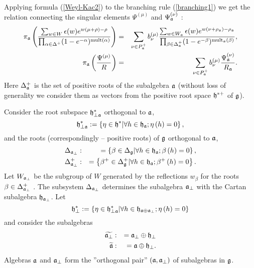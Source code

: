Applying formula (\ref{Weyl-Kac2}) to the branching rule (\ref{branching1})
we get the relation connecting the
singular elements $\Psi ^{\left( \mu \right) }$ and $\Psi _{ \mathfrak{a}}^{\left( \nu \right) }$ :
\begin{eqnarray}
\nonumber
\pi _{\af}\left( \frac{\sum_{w \in W}\epsilon (w )e^{w
(\mu +\rho )-\rho }}{\prod_{\alpha \in \Delta ^{+}}(1-e^{-\alpha })^{\mathrm{%
mult}(\alpha )}}\right) &=&\sum_{\nu \in P_{\af}^{+}}b_{\nu }^{(\mu )}%
\frac{\sum_{w \in W_{\af}}\epsilon (w )e^{w (\nu +\rho _{%
\af})-\rho _{\af}}}{\prod_{\beta \in \Delta _{\af%
}^{+}}(1-e^{-\beta })^{\mathrm{mult}_{\af}(\beta )}},  \label{eq:4} \\
\pi _{\af}\left( \frac{\Psi ^{\left( \mu \right) }}{R}\right)
&=&\sum_{\nu \in P_{\af}^{+}}b_{\nu }^{(\mu )}\frac{\Psi _{ \frak{%
a}}^{\left( \nu \right) }}{R_{\af}}.
\end{eqnarray}
Here $\Delta _{\mathfrak{a}}^{+}$ is the set of
positive roots of the subalgebra $\mathfrak{a}$ (without loss of generality we consider
them as vectors from the positive root space $\frak{h}^{\ast  +}$ of $\frak{g}$).


Consider the root subspace
$\frak{h}_{\perp \mathfrak{a}}^{\ast }$ orthogonal to  $\mathfrak{a}$,
\begin{equation*}
\frak{h}_{\perp \mathfrak{a}}^{\ast }:=\left\{ \eta \in \frak{h}^{\ast }
|\forall h \in \mathfrak{h}_{\mathfrak{a}};  \eta\left(h \right)=0 \right\} ,
\end{equation*}
and the roots (correspondingly -- positive roots) of $\frak{g}$ orthogonal
to $\mathfrak{a}$,
\begin{eqnarray*}
\Delta _{\af_{\perp }} &:&=\left\{ \beta \in \Delta _{\frak{g}}|
\forall h \in \hf_{\af};  \beta\left(h \right)=0  \right\} , \\
\Delta _{\af_{\perp }}^{+} &:&=\left\{ \beta ^{+}\in \Delta _{\frak{g}%
}^{+}|\forall h \in \hf_{\af};  \beta^{+}\left(h \right)=0  \right\} .
\end{eqnarray*}
Let $W_{\mathfrak{a}_{\perp }}$ be the subgroup of $W$ generated by the
reflections $w _{\beta }$ for the roots $\beta \in \Delta _{\af%
_{\perp }}^{+}$ . The subsystem $\Delta _{\mathfrak{a}_{\perp }}$ determines the
subalgebra $\mathfrak{a}_{\perp }$ with the Cartan subalgebra $\frak{h}_{\af%
_{\perp }}$. Let
\begin{equation*}
\frak{h}_{\perp }^{\ast }:=\left\{ \eta \in \frak{h}_{\perp \mathfrak{a}}^{\ast
}|\forall h \in \mathfrak{h}_{\mathfrak{a}\oplus \mathfrak{a}_{\perp}}; \eta \left( h \right)=0 \right\}
\end{equation*}
and consider the subalgebras
\begin{eqnarray*}
\widetilde{\mathfrak{a}_{\perp }} &:&=\mathfrak{a}_{\perp }\oplus \frak{h}_{\perp }
\\
\widetilde{\mathfrak{a}} &:&=\mathfrak{a}\oplus \frak{h}_{\perp }.
\end{eqnarray*}
Algebras $\mathfrak{a}$ and $\mathfrak{a}_{\perp }$ form the ''orthogonal pair''
$\left( \mathfrak{a},\mathfrak{a}_{\perp}\right) $
of subalgebras in $\frak{g}$.

